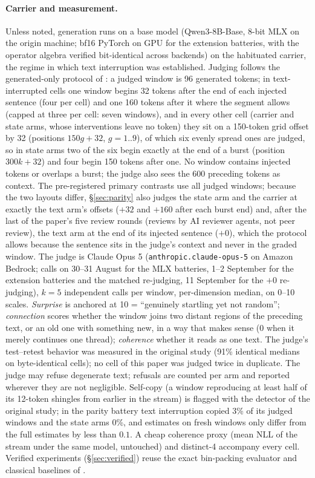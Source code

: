 \documentclass[11pt]{article}
\begin{document}
\paragraph{Carrier and measurement.} Unless noted, generation runs on a
base model (Qwen3-8B-Base, 8-bit MLX on the origin machine; bf16 PyTorch
on GPU for the extension batteries, with the operator algebra verified
bit-identical across backends) on the habituated carrier, the regime
in which text interruption was established. Judging follows the
generated-only protocol of \citet{ono2026interrupting}: a judged window
is 96 generated tokens; in text-interrupted cells one window begins 32 tokens
after the end of each injected sentence (four per cell) and one 160
tokens after it where the segment allows (capped at three per cell:
seven windows), and in every other cell (carrier and state arms, whose
interventions leave no token) they sit on a 150-token grid offset by 32
(positions $150g{+}32$, $g = 1..9$), of which six evenly spread ones are
judged, so in state arms two of the six begin exactly at the end of a
burst (position $300k{+}32$) and four begin 150 tokens after one. No
window contains injected tokens or overlaps a burst; the judge also sees
the 600 preceding tokens as context. The pre-registered primary
contrasts use all judged windows; because the two layouts differ,
\S\ref{sec:parity} also judges the state arm and the carrier at exactly
the text arm's offsets ($+32$ and $+160$ after each burst end) and,
after the last of the paper's five review rounds (reviews by AI reviewer
agents, not peer review), the text arm at the end of its injected sentence
($+0$), which the protocol allows because the sentence sits in the
judge's context and never in the graded window.
The judge is Claude Opus 5 (\texttt{anthropic.claude-opus-5} on Amazon
Bedrock; calls on 30--31 August for the MLX batteries, 1--2 September
for the extension batteries and the matched re-judging, 11 September for
the $+0$ re-judging), $k{=}5$ independent calls per window,
per-dimension median, on 0--10 scales. \emph{Surprise} is anchored at
10 = ``genuinely startling yet not random''; \emph{connection} scores
whether the window joins two distant regions of the preceding text, or
an old one with something new, in a way that makes sense (0 when it
merely continues one thread); \emph{coherence} whether it reads as one
text. The judge's test--retest behavior was measured in the original
study (91\% identical medians on byte-identical cells); no cell of this
paper was judged twice in duplicate.
The judge may refuse degenerate text; refusals are counted per arm and
reported wherever they are not negligible. Self-copy (a window
reproducing at least half of its 12-token shingles from earlier in the
stream) is flagged with the detector of the original study; in the
parity battery text interruption copied 3\% of its judged
windows and the state arms 0\%, and estimates on fresh windows only
differ from the full estimates by less than $0.1$. A cheap coherence
proxy (mean NLL of the stream under the same model, untouched) and
distinct-4 accompany every cell. Verified experiments
(\S\ref{sec:verified}) reuse the exact bin-packing evaluator and
classical baselines of \citet{ono2026mass}.
\end{document}
